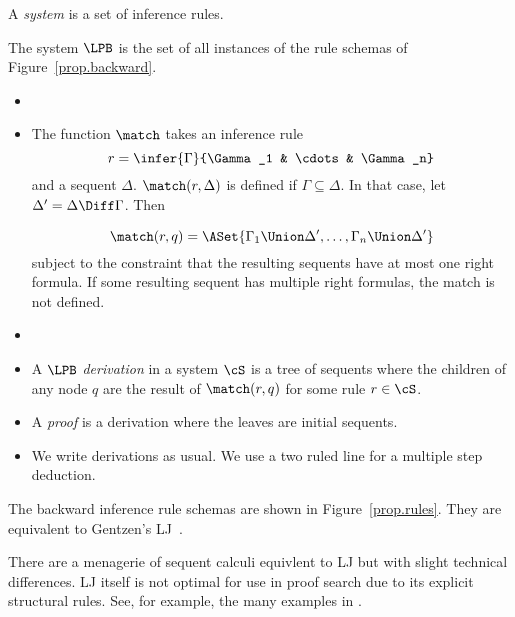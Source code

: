 \begin{definition}
  A \emph{system} is a set of inference rules.
\end{definition}

\begin{definition}
  The system $\LPB$ is the set of all instances of
  the rule schemas of Figure~\ref{prop.backward}.
\end{definition}

\begin{definition}
  \label{prop.def.backward-match}
  \begin{itemize}
  \item[]
  \item The function \emph{$\match$} takes an inference rule
    \[
    r=\infer
    {\Gamma}
    {\Gamma_1 & \cdots & \Gamma_n}
    \]
    \noindent
    and a sequent $\Delta$.  $\match(r, \Delta)$ is defined
    if $\Gamma \subseteq \Delta$.
    In that case, let $\Delta'=\Delta\Diff\Gamma$.  Then

    \[
    \match(r, q) = \ASet{\Gamma_1\Union\Delta', \ldots, \Gamma_n\Union\Delta'}
    \]
    \noindent
    subject to the constraint that the resulting sequents
    have at most one right formula.  If some resulting sequent
    has multiple right formulas, the
    match is not defined.
  \end{itemize}
\end{definition}

\begin{definition}
  \begin{itemize}
  \item[]
  \item A $\LPB$ \emph{derivation} in a system $\cS$ is a tree of sequents where the children of
    any node $q$ are the result of $\match(r, q)$ for some rule $r\in\cS$.
  \item A \emph{proof} is a derivation where the leaves are initial sequents.
  \item We write derivations as usual.  We use a two ruled line for a multiple
    step deduction.
  \end{itemize}
\end{definition}



\noindent The backward inference rule schemas are shown in
Figure~\ref{prop.rules}.  They
are equivalent to Gentzen's LJ~\cite{Gentzen.1934.MZ}.

\begin{remark}
There are a menagerie of sequent calculi equivlent to LJ but with slight
technical differences.  LJ itself is not optimal for use in proof search due to
its explicit structural rules.  See, for example, the many examples in
\cite[Chapter 3]{Troelstra.2000.ProofTheory}.
\end{remark}

